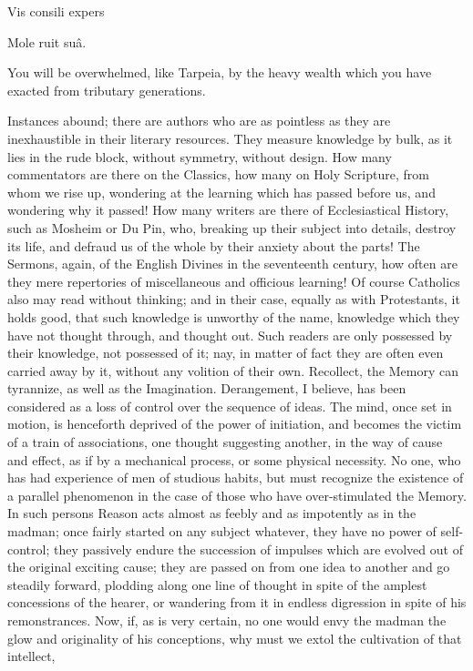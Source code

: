 Vis consili expers

Mole ruit suâ.

You will be overwhelmed, like Tarpeia, by the heavy wealth which
you have exacted from tributary generations.

Instances abound; there are authors who are as pointless as they
are inexhaustible in their literary resources. They measure knowledge
by bulk, as it lies in the rude block, without symmetry, without
design. How many commentators are there on the Classics, how many on
Holy Scripture, from whom we rise up, wondering at the learning which
has passed before us, and wondering why it passed! How many writers
are there of Ecclesiastical History, such as Mosheim or Du Pin, who,
breaking up their subject into details, destroy its life, and defraud
us of the whole by their anxiety about the parts! The Sermons, again,
of the English Divines in the seventeenth century, how often are they
mere repertories of miscellaneous and officious learning! Of course
Catholics also may read without thinking; and in their case,
equally as with Protestants, it holds good, that such knowledge is
unworthy of the name, knowledge which they have not thought through,
and thought out. Such readers are only possessed by their knowledge,
not possessed of it; nay, in matter of fact they are often even
carried away by it, without any volition of their own. Recollect, the
Memory can tyrannize, as well as the Imagination. Derangement, I
believe, has been considered as a loss of control over the sequence of
ideas. The mind, once set in motion, is henceforth deprived of the
power of initiation, and becomes the victim of a train of
associations, one thought suggesting another, in the way of cause and
effect, as if by a mechanical process, or some physical necessity. No
one, who has had experience of men of studious habits, but must
recognize the existence of a parallel phenomenon in the case of those
who have over-stimulated the Memory. In such persons Reason acts
almost as feebly and as impotently as in the madman; once fairly
started on any subject whatever, they have no power of self-control;
they passively endure the succession of impulses which are evolved out
of the original exciting cause; they are passed on from one idea to
another and go steadily forward, plodding along one line of thought in
spite of the amplest concessions of the hearer, or wandering from it
in endless digression in spite of his remonstrances. Now, if, as is
very certain, no one would envy the madman the glow and originality of
his conceptions, why must we extol the cultivation of that intellect,
